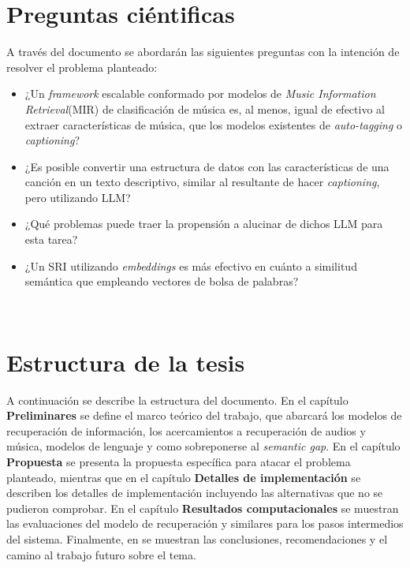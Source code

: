 \section{Preguntas ciéntificas}
A través del documento se abordarán las siguientes preguntas con la intención de resolver el problema planteado:
\begin{itemize}
    \item ¿Un \textit{framework} escalable conformado por modelos de \textit{Music Information Retrieval}(MIR) de clasificación de música es, al menos, igual de efectivo al extraer características de música, que los modelos existentes de \textit{auto-tagging} o \textit{captioning}?
    \item ¿Es posible convertir una estructura de datos con las características de una canción en un texto descriptivo, similar al resultante de hacer \textit{captioning}, pero utilizando LLM?
    \item ¿Qué problemas puede traer la propensión a alucinar de dichos LLM para esta tarea?
    \item ¿Un SRI utilizando \textit{embeddings} es más efectivo en cuánto a similitud semántica que empleando vectores de bolsa de palabras? %
\end{itemize}\\
\section{Estructura de la tesis}
A continuación se describe la estructura del documento. En el capítulo \textbf{Preliminares} se define el marco teórico del trabajo, que abarcará los modelos de recuperación de información, los acercamientos a recuperación de audios y música, modelos de lenguaje y como sobreponerse al \textit{semantic gap}. En el capítulo \textbf{Propuesta} se presenta la propuesta específica para atacar el problema planteado, mientras que en el capítulo \textbf{Detalles de implementación} se describen los detalles de implementación incluyendo las alternativas que no se pudieron comprobar. En el capítulo \textbf{Resultados computacionales} se muestran las evaluaciones del modelo de recuperación y similares para los pasos intermedios del sistema. Finalmente, en se muestran las conclusiones, recomendaciones y el camino al trabajo futuro sobre el tema.



